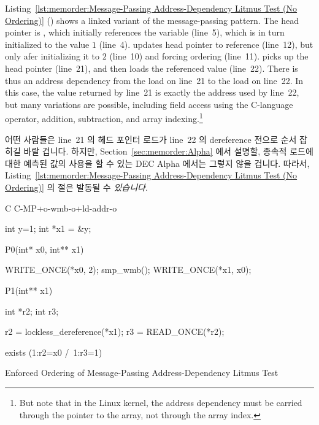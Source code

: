 Listing~\ref{lst:memorder:Message-Passing Address-Dependency Litmus Test (No Ordering)}
()
shows a linked variant of the message-passing pattern.
The head pointer is , which initially
references the  variable  (line~5), which is in turn
initialized to the value $1$ (line~4).
 updates head pointer  to reference  (line~12),
but only afer initializing it to $2$ (line~10) and forcing ordering
(line~11).
 picks up the head pointer  (line~21), and then loads
the referenced value (line~22).
There is thus an address dependency from the load on line~21 to the
load on line~22.
In this case, the value returned by line~21 is exactly the address
used by line~22, but many variations are possible,
including field access using the C-language \co{->} operator,
addition, subtraction, and array indexing.\footnote{
	But note that in the Linux kernel, the address dependency must
	be carried through the pointer to the array, not through the
	array index.}
\fi

어떤 사람들은 line~21 의 헤드 포인터 로드가 line~22 의 dereference 전으로 순서
잡히길 바랄 겁니다.
하지만,
Section~\ref{sec:memorder:Alpha} 에서 설명할, 종속적 로드에 대한 예측된 값의
사용을 할 수 있는 DEC Alpha 에서는 그렇지 않을 겁니다.
따라서,
Listing~\ref{lst:memorder:Message-Passing Address-Dependency Litmus Test (No Ordering)}
의  절은 발동될 수 \emph{있습니다}.

\begin{listing}[tbp]
{ \scriptsize
\begin{verbbox}[\LstLineNo]
C C-MP+o-wmb-o+ld-addr-o

{
int y=1;
int *x1 = &y;
}

P0(int* x0, int** x1) {

  WRITE_ONCE(*x0, 2);
  smp_wmb();
  WRITE_ONCE(*x1, x0);

}

P1(int** x1) {

  int *r2;
  int r3;

  r2 = lockless_dereference(*x1);
  r3 = READ_ONCE(*r2);

}

exists (1:r2=x0 /\ 1:r3=1)
\end{verbbox}
}
\centering
\theverbbox
\caption{Enforced Ordering of Message-Passing Address-Dependency Litmus Test}
\label{lst:memorder:Enforced Ordering of Message-Passing Address-Dependency Litmus Test}
\end{listing}

